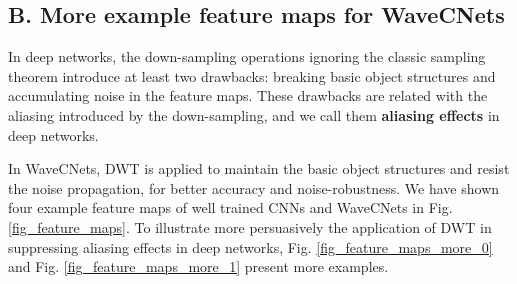 \subsection*{B. More example feature maps for WaveCNets}
In deep networks, the down-sampling operations ignoring the classic sampling theorem introduce at least two drawbacks:
breaking basic object structures and accumulating noise in the feature maps.
These drawbacks are related with the aliasing introduced by the down-sampling,
and we call them \textbf{aliasing effects} in deep networks.

In WaveCNets, DWT is applied to maintain the basic object structures and resist the noise propagation,
for better accuracy and noise-robustness.
We have shown four example feature maps of well trained CNNs and WaveCNets in Fig. \ref{fig_feature_maps}.
To illustrate more persuasively the application of DWT in suppressing aliasing effects in deep networks,
Fig. \ref{fig_feature_maps_more_0} and Fig. \ref{fig_feature_maps_more_1} present more examples.

